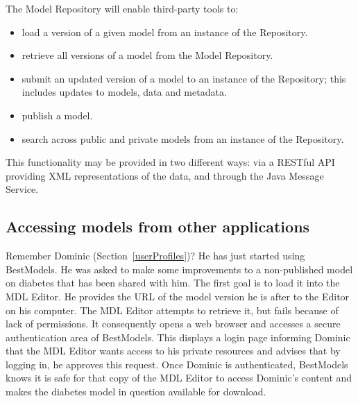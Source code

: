 The \ddmore Model Repository will enable third-party tools to:
\begin{itemize}
\item load a version of a given model from an instance of the Repository.
\item retrieve all versions of a model from the Model Repository.
\item submit an updated version of a model to an instance of the Repository; this includes updates to models, data and metadata. 
\item publish a model.
\item search across public and private models from an instance of the Repository.
\end{itemize}

\begin{techNote}
This functionality may be provided in two different ways: via a RESTful API providing XML representations of the data, and through the Java Message Service. 
\end{techNote}


\subsection{Accessing models from other applications}
\label{remoteAuth}
Remember Dominic (Section~\ref{userProfiles})? He has just started using BestModels. He was asked to make some improvements to a non-published model on diabetes that has been shared with him. The first goal is to load it into the MDL Editor. He provides the URL of the model version he is after to the Editor on his computer. The MDL Editor attempts to retrieve it, but fails because of lack of permissions. It consequently opens a web browser and accesses a secure authentication area of BestModels. This displays a login page informing Dominic that the MDL Editor wants access to his private resources and advises that by logging in, he approves this request. Once Dominic is authenticated, BestModels knows it is safe for that copy of the MDL Editor to access Dominic's content and makes the diabetes model in question available for download. 

